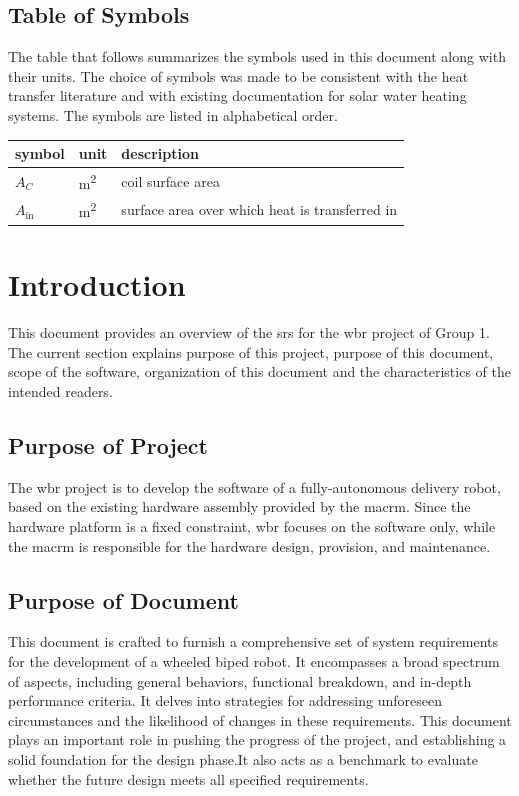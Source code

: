 \documentclass[12pt]{article}
\begin{document}
    \subsection{Table of Symbols}
        The table that follows summarizes the symbols used in this document along with
        their units.  The choice of symbols was made to be consistent with the heat
        transfer literature and with existing documentation for solar water heating
        systems.  The symbols are listed in alphabetical order.
        
        \renewcommand{\arraystretch}{1.2}
        \noindent \begin{longtable*}{l l p{12cm}} \toprule
        \textbf{symbol} & \textbf{unit} & \textbf{description}\\
        \midrule 
        $A_C$ & \si[per-mode=symbol] {\square\metre} & coil surface area
        \\
        $A_\text{in}$ & \si[per-mode=symbol] {\square\metre} & surface area over 
        which heat is transferred in
        \\ 
        \bottomrule
        \end{longtable*}
    
    \printnoidxglossary[type=\acronymtype,style=mystyle,title=Abbreviations and Acronyms]

\section{Introduction}
    This document provides an overview of the \acrfull{srs} for the \acrfull{wbr} project of Group 1. The current section explains purpose of this project, purpose of this document, scope of the software, organization of this document and the characteristics of the intended readers.
    \subsection{Purpose of Project}
        The \acrshort{wbr} project is to develop the software of a fully-autonomous delivery robot, based on the existing hardware assembly provided by the \acrfull{macrm}. Since the hardware platform is a fixed constraint, \acrshort{wbr} focuses on the software only, while the \acrshort{macrm} is responsible for the hardware design, provision, and maintenance.
    \subsection{Purpose of Document}
        This document is crafted to furnish a comprehensive set of system requirements for the development of a wheeled biped robot. It encompasses a broad spectrum of aspects, including general behaviors, functional breakdown, and in-depth performance criteria. It delves into strategies for addressing unforeseen circumstances and the likelihood of changes in these requirements. This document plays an important role in pushing the progress of the project, and establishing a solid foundation for the design phase.It also acts as a benchmark to evaluate whether the future design meets all specified requirements.
\end{document}

